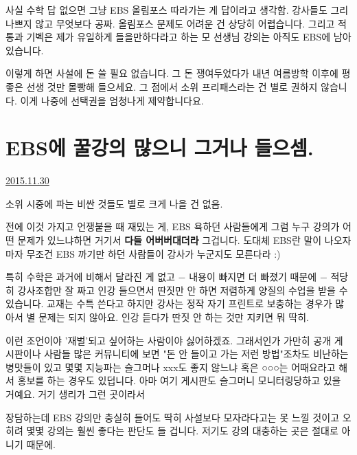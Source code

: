 사실 수학 답 없으면 그냥 EBS 올림포스 따라가는 게 답이라고 생각함. 강사들도 그리 나쁘지 않고 무엇보다 공짜.
올림포스 문제도 어려운 건 상당히 어렵습니다.
그리고 적통과 기벡은 제가 유일하게 들을만하다라고 하는 모 선생님 강의는 아직도 EBS에 남아있습니다.
\vspace{5mm}

이렇게 하면 사설에 돈 쓸 필요 없습니다.
그 돈 쟁여두었다가 내년 여름방학 이후에 평 좋은 선생 것만 몰빵해 들으세요.
그 점에서 소위 프리패스라는 건 별로 권하지 않습니다. 이게 나중에 선택권을 엄청나게 제약합니다요.
\vspace{5mm}




\section{EBS에 꿀강의 많으니 그거나 들으셈.}
\href{https://www.kockoc.com/Apoc/520024}{2015.11.30}

\vspace{5mm}

소위 시중에 파는 비싼 것들도 별로 크게 나을 건 없음.
\vspace{5mm}

전에 이것 가지고 언쟁붙을 때 재밌는 게,
EBS 욕하던 사람들에게 그럼 누구 강의가 어떤 문제가 있느냐하면 거기서 \textbf{다들 어버버대더라} 그겁니다.
도대체 EBS란 말이 나오자마자 무조건 EBS 까기만 하던 사람들이 강사가 누군지도 모른다라 :)
\vspace{5mm}

특히 수학은 과거에 비해서 달라진 게 없고 $-$ 내용이 빠지면 더 빠졌기 때문에 $-$
적당히 강사조합만 잘 짜고 인강 들으면서 딴짓만 안 하면 저렴하게 양질의 수업을 받을 수 있습니다.
교재는 수특 쓴다고 하지만 강사는 정작 자기 프린트로 보충하는 경우가 많아서 별 문제는 되지 않아요.
인강 듣다가 딴짓 안 하는 것만 지키면 뭐 딱히.
\vspace{5mm}

이런 조언이야 '재벌'되고 싶어하는 사람이야 싫어하겠죠.
그래서인가 가만히 공개 게시판이나 사람들 많은 커뮤니티에 보면 "돈 안 들이고 가는 저런 방법"조차도 비난하는 병맛들이 있고
몇몇 지능파는 슬그머나 xxx도 좋지 않느냐 혹은 ○○○는 어때요라고 해서 홍보를 하는 경우도 있덥니다.
아마 여기 게시판도 슬그머니 모니터링당하고 있을 거예요. 거기 생리가 그런 곳이라서
\vspace{5mm}

장담하는데 EBS 강의만 충실히 들어도 딱히 사설보다 모자라다고는 못 느낄 것이고
오히려 몇몇 강의는 훨씬 좋다는 판단도 들 겁니다. 저기도 강의 대충하는 곳은 절대로 아니기 때문에.
\vspace{5mm}

